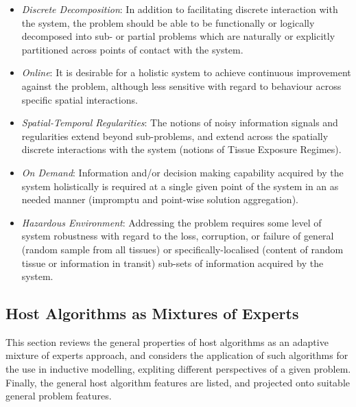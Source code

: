 \begin{itemize}		
	\item \emph{Discrete Decomposition}: In addition to facilitating discrete interaction with the system, the problem should be able to be functionally or logically decomposed into sub- or partial problems which are naturally or explicitly partitioned across points of contact with the system.
	\item \emph{Online}: It is desirable for a holistic system to achieve continuous improvement against the problem, although less sensitive with regard to behaviour across specific spatial interactions.
	\item \emph{Spatial-Temporal Regularities}: The notions of noisy information signals and regularities extend beyond sub-problems, and extend across the spatially discrete interactions with the system (notions of Tissue Exposure Regimes).		
	\item \emph{On Demand}: Information and/or decision making capability acquired by the system holistically is required at a single given point of the system in an as needed manner (impromptu and point-wise solution aggregation).
	\item \emph{Hazardous Environment}: Addressing the problem requires some level of system robustness with regard to the loss, corruption, or failure of general (random sample from all tissues) or specifically-localised (content of random tissue or information in transit) sub-sets of information acquired by the system.
\end{itemize}


%
%
\subsection{Host Algorithms as Mixtures of Experts}
This section reviews the general properties of host algorithms as an adaptive mixture of experts approach, and considers the application of such algorithms for the use in inductive modelling, expliting different perspectives of a given problem. Finally, the general host  algorithm features are listed, and projected onto suitable general problem features.

%
%
